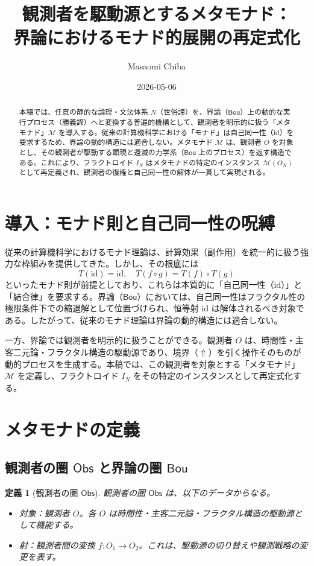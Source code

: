 \documentclass[11pt]{article}
\title{観測者を駆動源とするメタモナド：\\
界論におけるモナド的展開の再定式化}
\author{Masaomi Chiba}
\date{2026-05-06}
\newcommand{\Bou}{\textsf{Bou}}
\newcommand{\Obs}{\textsf{Obs}}
\newcommand{\M}{\mathcal{M}}
\newcommand{\metanegation}{\Uparrow}
\newcommand{\fractaloid}{I}
\newcommand{\ObsN}{O_N}
\newtheorem{definition}{定義}
\begin{document}
\maketitle

\begin{abstract}
本稿では、任意の静的な論理・文法体系 $N$（世俗諦）を、界論（$\Bou$）上の動的な実行プロセス（勝義諦）へと変換する普遍的機構として、観測者を明示的に扱う「メタモナド」$\M$ を導入する。従来の計算機科学における「モナド」は自己同一性（$\mathrm{id}$）を要求するため、界論の動的構造には適合しない。メタモナド $\M$ は、観測者 $O$ を対象とし、その観測者が駆動する顕現と還滅の力学系（$\Bou$ 上のプロセス）を返す構造である。これにより、フラクトロイド $\fractaloid_N$ はメタモナドの特定のインスタンス $\M(\ObsN)$ として再定義され、観測者の復権と自己同一性の解体が一貫して実現される。
\end{abstract}

\section{導入：モナド則と自己同一性の呪縛}

従来の計算機科学におけるモナド理論は、計算効果（副作用）を統一的に扱う強力な枠組みを提供してきた。しかし、その根底には
\[
T(\mathrm{id}) = \mathrm{id}, \quad T(f \circ g) = T(f) \circ T(g)
\]
といったモナド則が前提としており、これらは本質的に「自己同一性（$\mathrm{id}$）」と「結合律」を要求する。界論（$\Bou$）においては、自己同一性はフラクタル性の極限条件下での縮退解として位置づけられ、恒等射 $\mathrm{id}$ は解体されるべき対象である。したがって、従来のモナド理論は界論の動的構造には適合しない。

一方、界論では観測者を明示的に扱うことができる。観測者 $O$ は、時間性・主客二元論・フラクタル構造の駆動源であり、境界（$\metanegation$）を引く操作そのものが動的プロセスを生成する。本稿では、この観測者を対象とする「メタモナド」$\M$ を定義し、フラクトロイド $\fractaloid_N$ をその特定のインスタンスとして再定式化する。

\section{メタモナドの定義}

\subsection{観測者の圏 $\Obs$ と界論の圏 $\Bou$}

\begin{definition}[観測者の圏 $\Obs$]
観測者の圏 $\Obs$ は、以下のデータからなる。
\begin{itemize}
\item 対象：観測者 $O$。各 $O$ は時間性・主客二元論・フラクタル構造の駆動源として機能する。
\item 射：観測者間の変換 $f : O_1 \to O_2$。これは、駆動源の切り替えや観測戦略の変更を表す。
\end{itemize}
\end{definition}
\end{document}

